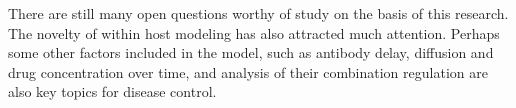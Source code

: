 \documentclass{CMHPhD-SIVD}
\begin{document}
There are still many open questions worthy of study on the basis of this research. The novelty of within host modeling has also attracted much attention. Perhaps some other factors included in the model, such as antibody delay, diffusion and drug concentration over time, and analysis of their combination regulation are also key topics for disease control.
\end{document}
